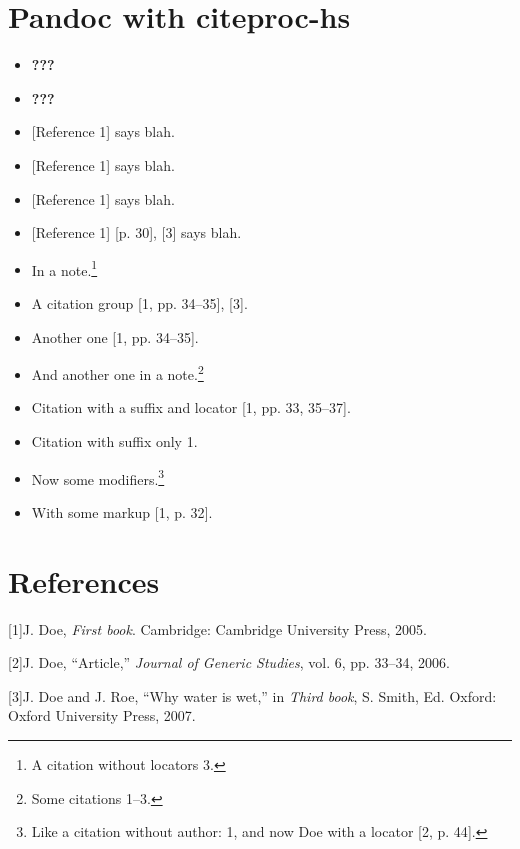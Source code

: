 \documentclass[9pt,twocolumn]{article}
\date{}
\makeatletter
\newcommand{\verbatimfont}[1]{\def\verbatim@font{#1}}%
\makeatother
\begin{document}
 
\small

\verbatimfont{\ttfamily\scriptsize}


\hypersetup{linkcolor=black}
\setcounter{tocdepth}{3}
\tableofcontents



\section{Pandoc with citeproc-hs}\label{pandoc-with-citeproc-hs}

\begin{itemize}
\item
  \textbf{???}
\item
  \textbf{???}
\item
  {[}Reference 1{]} says blah.
\item
  {[}Reference 1{]} says blah.
\item
  {[}Reference 1{]} says blah.
\item
  {[}Reference 1{]} {[}p. 30{]}, {[}3{]} says blah.
\item
  In a note.\footnote{A citation without locators 3.}
\item
  A citation group {[}1, pp. 34--35{]}, {[}3{]}.
\item
  Another one {[}1, pp. 34--35{]}.
\item
  And another one in a note.\footnote{Some citations 1--3.}
\item
  Citation with a suffix and locator {[}1, pp. 33, 35--37{]}.
\item
  Citation with suffix only 1.
\item
  Now some modifiers.\footnote{Like a citation without author: 1, and
    now Doe with a locator {[}2, p. 44{]}.}
\item
  With some markup {[}1, p. 32{]}.
\end{itemize}

\section{References}\label{references}



{[}1{]}J. Doe, \emph{First book}. Cambridge: Cambridge University Press,
2005.

{[}2{]}J. Doe, ``Article,'' \emph{Journal of Generic Studies}, vol. 6,
pp. 33--34, 2006.

{[}3{]}J. Doe and J. Roe, ``Why water is wet,'' in \emph{Third book}, S.
Smith, Ed. Oxford: Oxford University Press, 2007.
\end{document}
